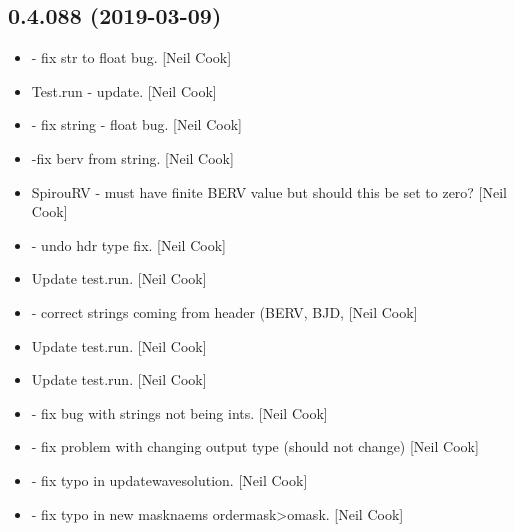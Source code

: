 \documentclass[a4paper,10pt,english]{report}
\begin{document}
\subsection{0.4.088 (2019-03-09)}
\label{\detokenize{misc/changelog:id173}}\begin{itemize}
\item {} 
 - fix str to float bug. {[}Neil Cook{]}

\item {} 
Test.run - update. {[}Neil Cook{]}

\item {} 
 - fix string - float bug. {[}Neil Cook{]}

\item {} 
 -fix berv from string. {[}Neil Cook{]}

\item {} 
SpirouRV - must have finite BERV value \textendash{} but should this be set to
zero? {[}Neil Cook{]}

\item {} 
 - undo hdr type fix. {[}Neil Cook{]}

\item {} 
Update test.run. {[}Neil Cook{]}

\item {} 
 - correct strings coming from header (BERV, BJD,
 {[}Neil Cook{]}

\item {} 
Update test.run. {[}Neil Cook{]}

\item {} 
Update test.run. {[}Neil Cook{]}

\item {} 
 - fix bug with strings not being ints. {[}Neil Cook{]}

\item {} 
 - fix problem with changing output type (should not
change) {[}Neil Cook{]}

\item {} 
 - fix typo in updatewavesolution. {[}Neil Cook{]}

\item {} 
 - fix typo in new masknaems ordermask\textendash{}\textgreater{}omask. {[}Neil
Cook{]}


\end{itemize}
\end{document}
